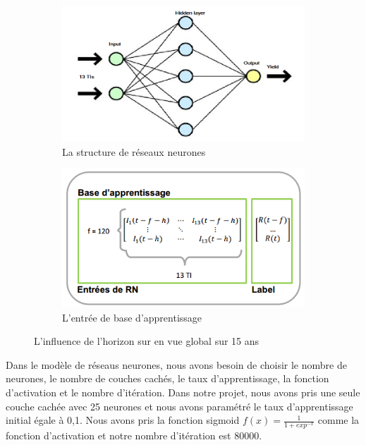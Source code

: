 \begin{figure}[H]
	\centering
	\begin{subfigure}{.5\textwidth}
	\includegraphics[width=.9\linewidth, scale=0.2]
	{plot/RN.png}
	\caption{La structure de réseaux neurones}
	\label{fig:RN}
	\end{subfigure}%
	\begin{subfigure}{.5\textwidth}
	\centering
	\includegraphics[width=.9\linewidth, scale=0.2]
	{plot/base.png}
	\caption{L'entrée de base d'apprentissage}
	\label{fig:base}
	\end{subfigure}
\caption{L'influence de l'horizon sur en vue global sur 15 ans}
\label{fig:structure_rn}
\end{figure}

Dans le modèle de réseaus neurones, nous avons besoin de choisir le nombre de neurones, le nombre de couches cachés, le taux d'apprentissage, la fonction d’activation et le nombre d'itération. Dans notre projet, nous avons pris une seule couche cachée avec 25 neurones et nous avons paramétré le taux d'apprentissage initial égale à 0,1. Nous avons pris la fonction sigmoid $ f(x) = \frac{1}{1 + exp^{-x}} $ comme la fonction d'activation et notre nombre d'itération est 80000.

